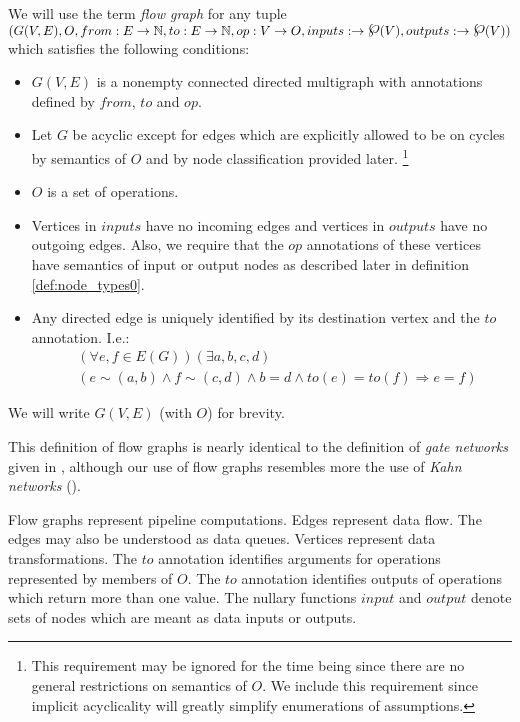  We will use the term \emph{flow graph} for any tuple $(G(V,E),O,from:E \arrow \N, to:E \arrow \N, op:V \arrow O,\\ inputs: \arrow \powerset(V), outputs: \arrow \powerset(V) )$ which satisfies the following conditions:
\begin{itemize}
  \item $G(V,E)$ is a nonempty connected directed multigraph with annotations defined by $from$, $to$ and $op$.  
  \item Let $G$ be acyclic except for edges which are explicitly allowed to be on cycles by semantics of $O$ and by node classification provided later. \footnote{This requirement may be ignored for the time being since there are no general restrictions on semantics of $O$. We include this requirement since implicit acyclicality will greatly simplify enumerations of assumptions.}
  \item $O$ is a set of operations.
  \item Vertices in $inputs$ have no incoming edges and vertices in $outputs$ have no outgoing edges. Also, we require that the $op$ annotations of these vertices have semantics of input or output nodes as described later in definition \ref{def:node_types0}.
  \item Any directed edge is uniquely identified by its destination vertex and the $to$ annotation. I.e.:
    \begin{align*} &(\forall{e,f \in E(G)})(\exists a,b,c,d) \\ &(e \sim (a,b) \land f \sim (c,d) \land b = d \land to(e) = to(f) \Rightarrow e = f )\end{align*}
\end {itemize}
    We will write $G(V,E)$ (with $O$) for brevity.
\myenddef

  This definition of flow graphs is nearly identical to the definition of \emph{gate networks} given in \cite{ads}, although our use of flow graphs resembles more the use of \emph{Kahn networks} (\cite{asdfe}). 

  Flow graphs represent pipeline computations. Edges represent data flow. The edges may also be understood as data queues. Vertices represent data transformations. The $to$ annotation identifies arguments for operations represented by members of $O$. The $to$ annotation identifies outputs of operations which return more than one value. The nullary functions $input$ and $output$ denote sets of nodes which are meant as data inputs or outputs.


